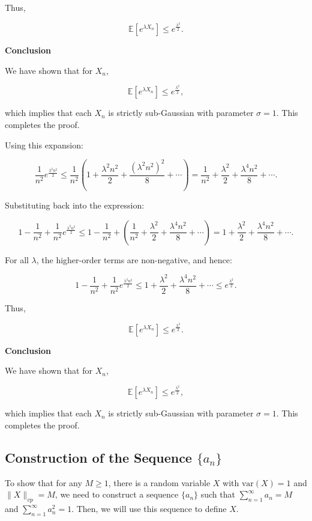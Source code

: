 \documentclass[a4 paper]{article}
\theoremstyle{boldStyle}
\theoremstyle{boldBlueStyle}
\theoremstyle{boldPurpleStyle}
\theoremstyle{boldRedStyle}
\begin{document}
\begin{enumerate}
Thus,

\[
\mathbb{E}[e^{\lambda X_n}] \leq e^{\frac{\lambda^2}{2}}.
\]

\textbf{ Conclusion}

We have shown that for \(X_n\),

\[
\mathbb{E}[e^{\lambda X_n}] \leq e^{\frac{\lambda^2}{2}},
\]

which implies that each \(X_n\) is strictly sub-Gaussian with parameter \(\sigma = 1\). This completes the proof.



Using this expansion:

\[
\frac{1}{n^2} e^{\frac{\lambda^2 n^2}{2}} \leq \frac{1}{n^2} \left(1 + \frac{\lambda^2 n^2}{2} + \frac{(\lambda^2 n^2)^2}{8} + \cdots \right) = \frac{1}{n^2} + \frac{\lambda^2}{2} + \frac{\lambda^4 n^2}{8} + \cdots.
\]

Substituting back into the expression:

\[
1 - \frac{1}{n^2} + \frac{1}{n^2} e^{\frac{\lambda^2 n^2}{2}} \leq 1 - \frac{1}{n^2} + \left(\frac{1}{n^2} + \frac{\lambda^2}{2} + \frac{\lambda^4 n^2}{8} + \cdots \right) = 1 + \frac{\lambda^2}{2} + \frac{\lambda^4 n^2}{8} + \cdots.
\]

For all \(\lambda\), the higher-order terms are non-negative, and hence:

\[
1 - \frac{1}{n^2} + \frac{1}{n^2} e^{\frac{\lambda^2 n^2}{2}} \leq 1 + \frac{\lambda^2}{2} + \frac{\lambda^4 n^2}{8} + \cdots \leq e^{\frac{\lambda^2}{2}}.
\]

Thus,

\[
\mathbb{E}[e^{\lambda X_n}] \leq e^{\frac{\lambda^2}{2}}.
\]

\textbf{ Conclusion}

We have shown that for \(X_n\),

\[
\mathbb{E}[e^{\lambda X_n}] \leq e^{\frac{\lambda^2}{2}},
\]

which implies that each \(X_n\) is strictly sub-Gaussian with parameter \(\sigma = 1\). This completes the proof.



\subsection*{Construction of the Sequence \(\{a_n\}\)}


To show that for any \(M \geq 1\), there is a random variable \(X\) with \(\mathrm{var}(X) = 1\) and \(\|X\|_{vp} = M\), we need to construct a sequence \(\{a_n\}\) such that \(\sum_{n=1}^{\infty} a_n = M\) and \(\sum_{n=1}^{\infty} a_n^2 = 1\). Then, we will use this sequence to define \(X\).


\end{enumerate}
\end{document}
